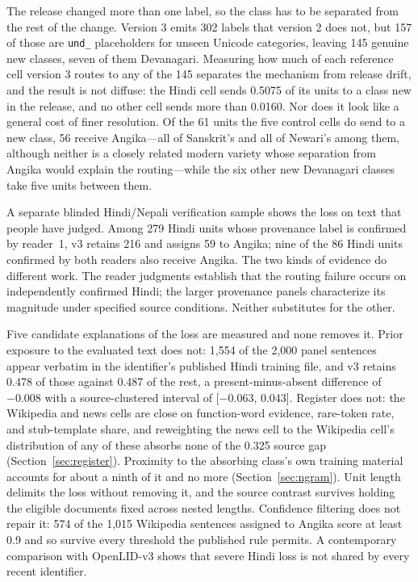 \documentclass[final]{clv2025}
\newcommand{\lab}[1]{\texttt{#1}}
\begin{document}
The release changed more than one label, so the class has to be separated from the rest of the change. Version 3 emits 302 labels that version 2 does not, but 157 of those are \lab{und\_} placeholders for unseen Unicode categories, leaving 145 genuine new classes, seven of them Devanagari. Measuring how much of each reference cell version 3 routes to any of the 145 separates the mechanism from release drift, and the result is not diffuse: the Hindi cell sends 0.5075 of its units to a class new in the release, and no other cell sends more than 0.0160. Nor does it look like a general cost of finer resolution. Of the 61 units the five control cells do send to a new class, 56 receive Angika---all of Sanskrit's and all of Newari's among them, although neither is a closely related modern variety whose separation from Angika would explain the routing---while the six other new Devanagari classes take five units between them.

A separate blinded Hindi/Nepali verification sample shows the loss on text that people have judged. Among 279 Hindi units whose provenance label is confirmed by reader~1, v3 retains 216 and assigns 59 to Angika; nine of the 86 Hindi units confirmed by both readers also receive Angika. The two kinds of evidence do different work. The reader judgments establish that the routing failure occurs on independently confirmed Hindi; the larger provenance panels characterize its magnitude under specified source conditions. Neither substitutes for the other.

Five candidate explanations of the loss are measured and none removes it. Prior exposure to the evaluated text does not: 1,554 of the 2,000 panel sentences appear verbatim in the identifier's published Hindi training file, and v3 retains 0.478 of those against 0.487 of the rest, a present-minus-absent difference of $-0.008$ with a source-clustered interval of [$-0.063$, $0.043$]. Register does not: the Wikipedia and news cells are close on function-word evidence, rare-token rate, and stub-template share, and reweighting the news cell to the Wikipedia cell's distribution of any of these absorbs none of the 0.325 source gap (Section~\ref{sec:register}). Proximity to the absorbing class's own training material accounts for about a ninth of it and no more (Section~\ref{sec:ngram}). Unit length delimits the loss without removing it, and the source contrast survives holding the eligible documents fixed across nested lengths. Confidence filtering does not repair it: 574 of the 1,015 Wikipedia sentences assigned to Angika score at least 0.9 and so survive every threshold the published rule permits. A contemporary comparison with OpenLID-v3 shows that severe Hindi loss is not shared by every recent identifier.
\end{document}
